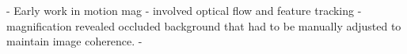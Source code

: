 \documentclass{article}
\begin{document}
- Early work in motion mag
- involved optical flow and feature tracking
- magnification revealed occluded background that had to be manually adjusted to maintain image coherence.
-
\end{document}
